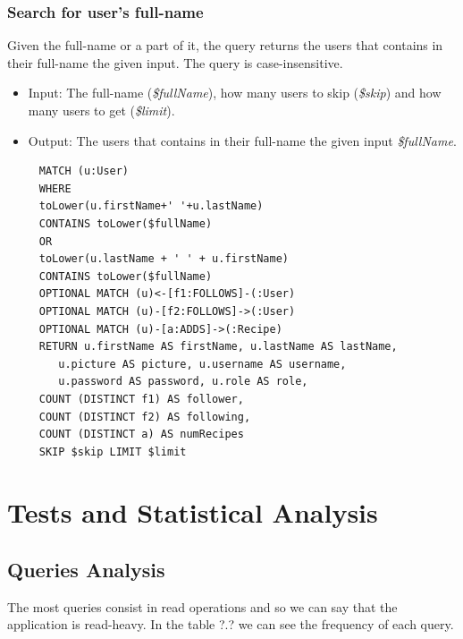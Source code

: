 \documentclass[a4paper]{report}
\begin{document}
\subsubsection{Search for user's full-name}
Given the full-name or a part of it, the query returns the users that contains in their full-name the given input. The query is case-insensitive.
\begin{itemize}
	\item Input: The full-name (\emph{\$fullName}), how many users to skip (\emph{\$skip}) and how many users to get (\emph{\$limit}).
	\item Output: The users that contains in their full-name the given input \emph{\$fullName}.
\end{itemize}
\begin{lstlisting}
	 MATCH (u:User) 
	 WHERE
	 toLower(u.firstName+' '+u.lastName)
	 CONTAINS toLower($fullName)
	 OR
	 toLower(u.lastName + ' ' + u.firstName)
	 CONTAINS toLower($fullName)
	 OPTIONAL MATCH (u)<-[f1:FOLLOWS]-(:User)
	 OPTIONAL MATCH (u)-[f2:FOLLOWS]->(:User)
	 OPTIONAL MATCH (u)-[a:ADDS]->(:Recipe)
	 RETURN u.firstName AS firstName, u.lastName AS lastName,
	 	u.picture AS picture, u.username AS username,
	 	u.password AS password, u.role AS role,
	 COUNT (DISTINCT f1) AS follower,
	 COUNT (DISTINCT f2) AS following,
	 COUNT (DISTINCT a) AS numRecipes
	 SKIP $skip LIMIT $limit
\end{lstlisting} 

\section{Tests and Statistical Analysis}
\subsection{Queries Analysis}
The most queries consist in read operations and so we can say that the application is read-heavy. In the table ?.? we can see the frequency of each query. 
\end{document}
